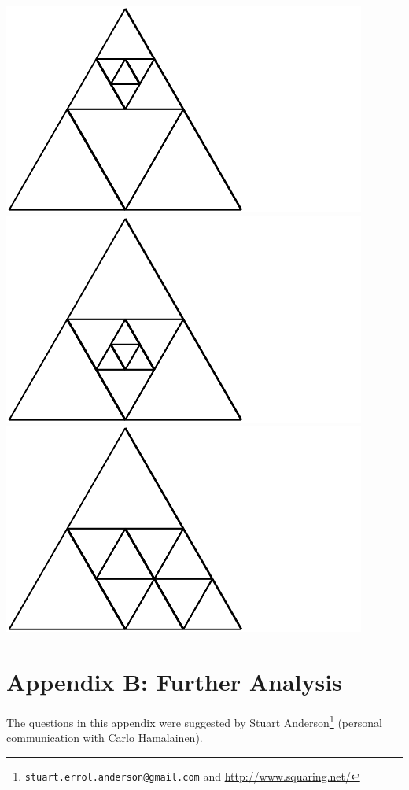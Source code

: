 \documentclass[12pt,amstags,fleqn]{article}
\theoremstyle{plain}
\theoremstyle{definition}
\begin{document}
\includegraphics{output-dissections-dissection10_i29_r2_c0.pdf}
\includegraphics{output-dissections-dissection10_i29_r2_c3.pdf}
\includegraphics{output-dissections-dissection10_i45_r3_c1.pdf}

\clearpage

\section*{Appendix B: Further Analysis}

The questions in this appendix were suggested by 
Stuart Anderson\footnote{\texttt{stuart.errol.anderson@gmail.com} and
\url{http://www.squaring.net/}} (personal communication with Carlo Hamalainen).
\end{document}
